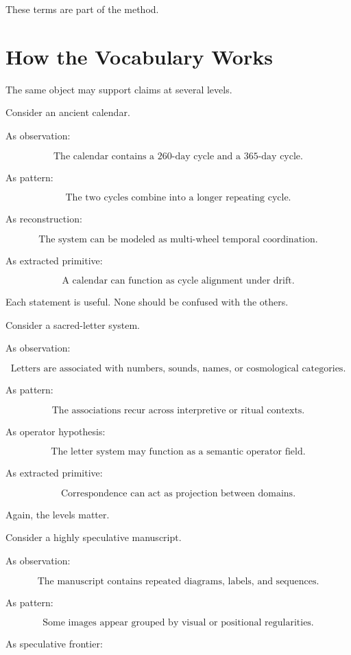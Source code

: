 \documentclass[11pt]{book}
\begin{document}
These terms are part of the method.

\section{How the Vocabulary Works}

The same object may support claims at several levels.

Consider an ancient calendar.

As observation:

\[
\text{The calendar contains a 260-day cycle and a 365-day cycle.}
\]

As pattern:

\[
\text{The two cycles combine into a longer repeating cycle.}
\]

As reconstruction:

\[
\text{The system can be modeled as multi-wheel temporal coordination.}
\]

As extracted primitive:

\[
\text{A calendar can function as cycle alignment under drift.}
\]

Each statement is useful. None should be confused with the others.

Consider a sacred-letter system.

As observation:

\[
\text{Letters are associated with numbers, sounds, names, or cosmological categories.}
\]

As pattern:

\[
\text{The associations recur across interpretive or ritual contexts.}
\]

As operator hypothesis:

\[
\text{The letter system may function as a semantic operator field.}
\]

As extracted primitive:

\[
\text{Correspondence can act as projection between domains.}
\]

Again, the levels matter.

Consider a highly speculative manuscript.

As observation:

\[
\text{The manuscript contains repeated diagrams, labels, and sequences.}
\]

As pattern:

\[
\text{Some images appear grouped by visual or positional regularities.}
\]

As speculative frontier:
\end{document}
